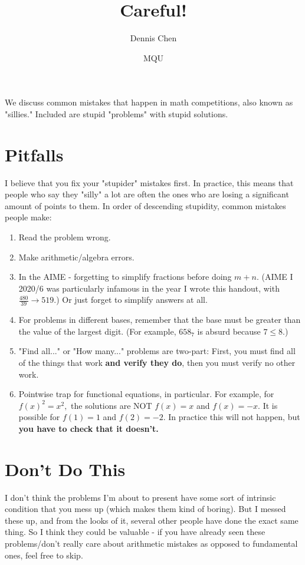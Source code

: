 \documentclass{article}
\title{Careful!}
\author{Dennis Chen}
\date{MQU}
\begin{document}
\maketitle
We discuss common mistakes that happen in math competitions, also known as "sillies." Included are stupid "problems" with stupid solutions.

\section{Pitfalls}
I believe that you fix your "stupider" mistakes first. In practice, this means that people who say they "silly" a lot are often the ones who are losing a significant amount of points to them. In order of descending stupidity, common mistakes people make:

\begin{enumerate}
    \item Read the problem wrong.

    \item Make arithmetic/algebra errors.
    
    \item In the AIME - forgetting to simplify fractions before doing $m+n.$ (AIME I 2020/6 was particularly infamous in the year I wrote this handout, with $\frac{480}{39}\to 519.$) Or just forget to simplify answers at all.
    
    \item For problems in different bases, remember that the base must be greater than the value of the largest digit. (For example, $658_7$ is absurd because $7\leq 8.$)
    
    \item "Find all..." or "How many..." problems are two-part: First, you must find all of the things that work \textbf{and verify they do}, then you must verify no other work.
    
    \item Pointwise trap for functional equations, in particular. For example, for $f(x)^2=x^2,$ the solutions are NOT $f(x)=x$ and $f(x)=-x.$ It is possible for $f(1)=1$ and $f(2)=-2.$ In practice this will not happen, but \textbf{you have to check that it doesn't.}
\end{enumerate}

\section{Don't Do This}
I don't think the problems I'm about to present have some sort of intrinsic condition that you mess up (which makes them kind of boring). But I messed these up, and from the looks of it, several other people have done the exact same thing. So I think they could be valuable - if you have already seen these problems/don't really care about arithmetic mistakes as opposed to fundamental ones, feel free to skip.
\end{document}
